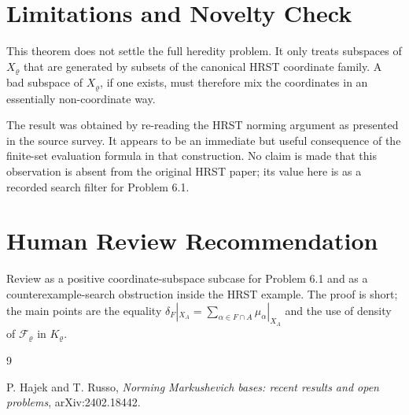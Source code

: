 \documentclass[11pt]{article}
\newcommand{\Krho}{K_\varrho}
\newcommand{\Frho}{\mathcal F_\varrho}
\newcommand{\Xrho}{X_\varrho}
\begin{document}
\section*{Limitations and Novelty Check}

This theorem does not settle the full heredity problem. It only treats
subspaces of $\Xrho$ that are generated by subsets of the canonical HRST
coordinate family. A bad subspace of $\Xrho$, if one exists, must therefore
mix the coordinates in an essentially non-coordinate way.

The result was obtained by re-reading the HRST norming argument as presented
in the source survey. It appears to be an immediate but useful consequence of
the finite-set evaluation formula in that construction. No claim is made that
this observation is absent from the original HRST paper; its value here is as
a recorded search filter for Problem 6.1.

\section*{Human Review Recommendation}

Review as a positive coordinate-subspace subcase for Problem 6.1 and as a
counterexample-search obstruction inside the HRST example. The proof is
short; the main points are the equality
$\delta_F|_{X_A}=\sum_{\alpha\in F\cap A}\mu_\alpha|_{X_A}$ and the use of
density of $\Frho$ in $\Krho$.

\begin{thebibliography}{9}

P. Hajek and T. Russo,
\emph{Norming Markushevich bases: recent results and open problems},
arXiv:2402.18442.

\end{thebibliography}
\end{document}
